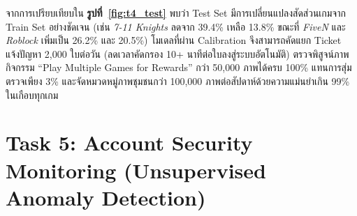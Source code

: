 \documentclass[11pt,a4paper]{article}
\begin{document}
จากการเปรียบเทียบใน \textbf{รูปที่~\ref{fig:t4_test}} พบว่า Test Set มีการเปลี่ยนแปลงสัดส่วนเกมจาก Train Set อย่างชัดเจน (เช่น \textit{7-11 Knights} ลดจาก 39.4\% เหลือ 13.8\% ขณะที่ \textit{FiveN} และ \textit{Roblock} เพิ่มเป็น 26.2\% และ 20.5\%) โมเดลที่ผ่าน Calibration จึงสามารถคัดแยก Ticket แจ้งปัญหา 2,000 ใบต่อวัน (ลดเวลาคัดกรอง 10+ นาทีต่อใบลงสู่ระบบอัตโนมัติ) ตรวจพิสูจน์ภาพกิจกรรม ``Play Multiple Games for Rewards'' กว่า 50,000 ภาพได้ครบ 100\% แทนการสุ่มตรวจเพียง 3\% และจัดหมวดหมู่ภาพชุมชนกว่า 100,000 ภาพต่อสัปดาห์ด้วยความแม่นยำเกิน 99\% ในเกือบทุกเกม

\clearpage
\section{Task 5: Account Security Monitoring (Unsupervised Anomaly Detection)}
\end{document}
